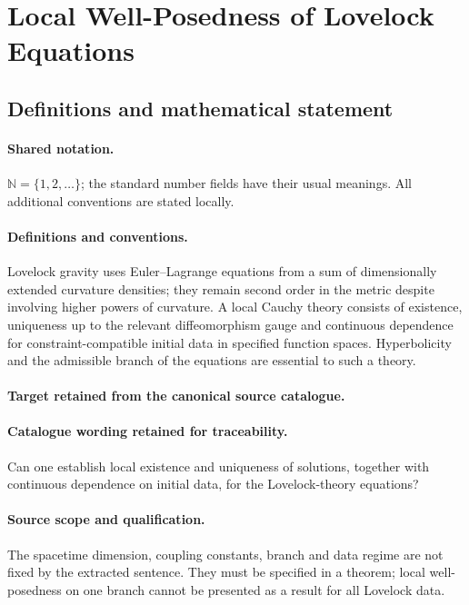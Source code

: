 \documentclass[11pt]{article}
\begin{document}
\section{Local Well-Posedness of Lovelock Equations}\label{statement}

\subsection{Definitions and mathematical statement}

\paragraph{Shared notation.}$\mathbb N=\{1,2,\ldots\}$; the standard number fields have their usual meanings. All additional conventions are stated locally.


\paragraph{Definitions and conventions.}
Lovelock gravity uses Euler--Lagrange equations from a sum of dimensionally extended curvature densities; they remain second order in the metric despite involving higher powers of curvature. A local Cauchy theory consists of existence, uniqueness up to the relevant diffeomorphism gauge and continuous dependence for constraint-compatible initial data in specified function spaces. Hyperbolicity and the admissible branch of the equations are essential to such a theory.

\paragraph{Target retained from the canonical source catalogue.}
\paragraph{Catalogue wording retained for traceability.}
Can one establish local existence and uniqueness of solutions, together with continuous dependence on initial data, for the Lovelock-theory equations?

\paragraph{Source scope and qualification.}
The spacetime dimension, coupling constants, branch and data regime are not fixed by the extracted sentence. They must be specified in a theorem; local well-posedness on one branch cannot be presented as a result for all Lovelock data.
\end{document}
